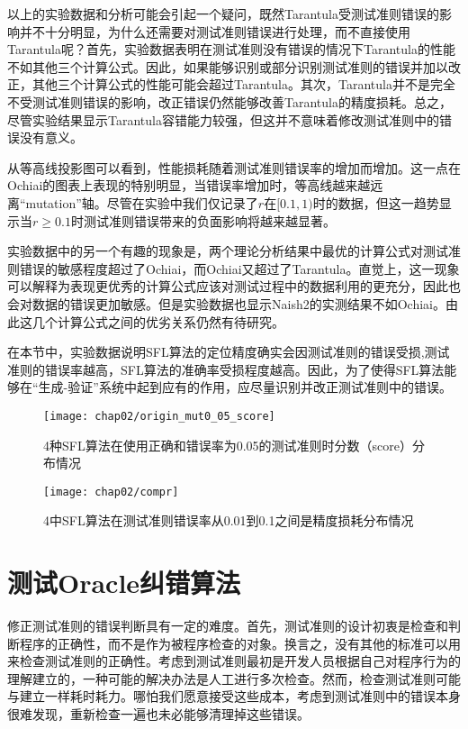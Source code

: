 以上的实验数据和分析可能会引起一个疑问，既然Tarantula受测试准则错误的影响并不十分明显，为什么还需要对测试准则错误进行处理，而不直接使用Tarantula呢？首先，实验数据表明在测试准则没有错误的情况下Tarantula的性能不如其他三个计算公式。因此，如果能够识别或部分识别测试准则的错误并加以改正，其他三个计算公式的性能可能会超过Tarantula。其次，Tarantula并不是完全不受测试准则错误的影响，改正错误仍然能够改善Tarantula的精度损耗。总之，尽管实验结果显示Tarantula容错能力较强，但这并不意味着修改测试准则中的错误没有意义。

从等高线投影图可以看到，性能损耗随着测试准则错误率的增加而增加。这一点在Ochiai的图表上表现的特别明显，当错误率增加时，等高线越来越远离“mutation”轴。尽管在实验中我们仅记录了$r$在$[0.1,1)$时的数据，但这一趋势显示当$r \ge 0.1$时测试准则错误带来的负面影响将越来越显著。

实验数据中的另一个有趣的现象是，两个理论分析结果中最优的计算公式对测试准则错误的敏感程度超过了Ochiai，而Ochiai又超过了Tarantula。直觉上，这一现象可以解释为表现更优秀的计算公式应该对测试过程中的数据利用的更充分，因此也会对数据的错误更加敏感。但是实验数据也显示Naish2的实测结果不如Ochiai。由此这几个计算公式之间的优劣关系仍然有待研究。

在本节中，实验数据说明SFL算法的定位精度确实会因测试准则的错误受损,测试准则的错误率越高，SFL算法的准确率受损程度越高。因此，为了使得SFL算法能够在“生成-验证”系统中起到应有的作用，应尽量识别并改正测试准则中的错误。
\begin{figure}
	\centering
	\texttt{[image: chap02/origin\_mut0\_05\_score]}
	\caption{4种SFL算法在使用正确和错误率为0.05的测试准则时分数（score）分布情况}
	\label{fig:score-correct-0.05}
\end{figure}

\begin{figure*}
	\centering
	\texttt{[image: chap02/compr]}
	\caption{4中SFL算法在测试准则错误率从0.01到0.1之间是精度损耗分布情况}
	\label{fig:compr}
\end{figure*}
\section{测试Oracle纠错算法}
修正测试准则的错误判断具有一定的难度。首先，测试准则的设计初衷是检查和判断程序的正确性，而不是作为被程序检查的对象。换言之，没有其他的标准可以用来检查测试准则的正确性。考虑到测试准则最初是开发人员根据自己对程序行为的理解建立的，一种可能的解决办法是人工进行多次检查。然而，检查测试准则可能与建立一样耗时耗力。哪怕我们愿意接受这些成本，考虑到测试准则中的错误本身很难发现，重新检查一遍也未必能够清理掉这些错误。


